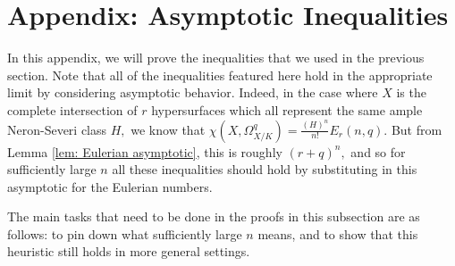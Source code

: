 \documentclass{article}
\theoremstyle{definition}
\theoremstyle{remark}
\begin{document}
\section{Appendix: Asymptotic Inequalities}
In this appendix, we will prove the inequalities that we used in the previous section. Note that all of the inequalities featured here hold in the appropriate limit by considering asymptotic behavior. Indeed, in the case where $X$ is the complete intersection of $r$ hypersurfaces which all represent the same ample Neron-Severi class $H,$ we know that $\chi(X, \Omega^q_{X/K}) = \frac{(H)^n}{n!} E_r(n, q).$ But from Lemma \ref{lem: Eulerian asymptotic}, this is roughly $(r + q)^n,$ and so for sufficiently large $n$ all these inequalities should hold by substituting in this asymptotic for the Eulerian numbers. 
\par The main tasks that need to be done in the proofs in this subsection are as follows: to pin down what sufficiently large $n$ means, and to show that this heuristic still holds in more general settings.
\end{document}
